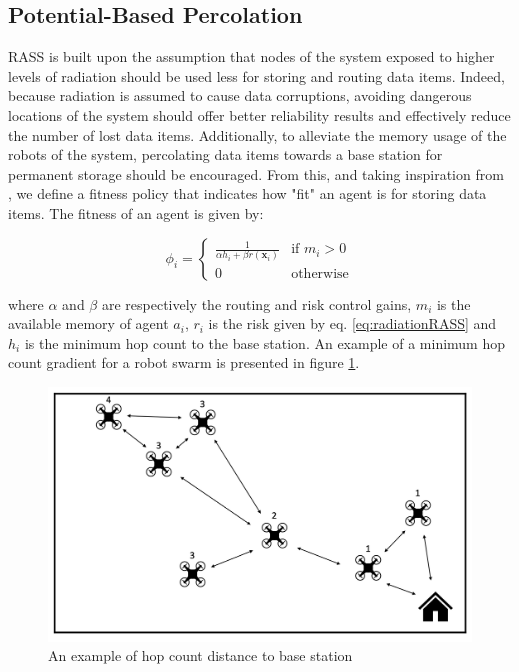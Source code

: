 \subsection{Potential-Based Percolation}

RASS is built upon the assumption that nodes of the system exposed to higher levels of radiation should be used less for storing and routing data items. Indeed, because radiation is assumed to cause data corruptions, avoiding dangerous locations of the system should offer better reliability results and effectively reduce the number of lost data items. Additionally, to alleviate the memory usage of the robots of the system, percolating data items towards a base station for permanent storage should be encouraged. From this, and taking inspiration from \cite{majcherczykSwarmmesh2020}, we define a fitness policy that indicates how "fit" an agent is for storing data items. The fitness of an agent is given by:

\begin{equation}
        \phi_i =
        \left\{ 
        \begin{array}{ll}
            \frac{1}{\alpha h_i + \beta r({\bm{x}_i})} &\text{if } m_i > 0 \\
            0 &\text{otherwise}
        \end{array} \right.
        \label{equation:fitness}
\end{equation}

where $\alpha$ and $\beta$ are respectively the routing and risk control gains, $m_i$ is the available memory of agent $a_i$,  $r_i$ is the risk given by eq. \ref{eq:radiationRASS} and $h_i$ is the minimum hop count to the base station. An example of a minimum hop count gradient for a robot swarm is presented in figure \ref{hop_count_rass}. 

\begin{figure}[htbp]
	\centering
    \includegraphics[width=0.75\columnwidth]{images/hop_count.png}
    \caption{An example of hop count distance to base station}
    \label{hop_count_rass}
\end{figure}

